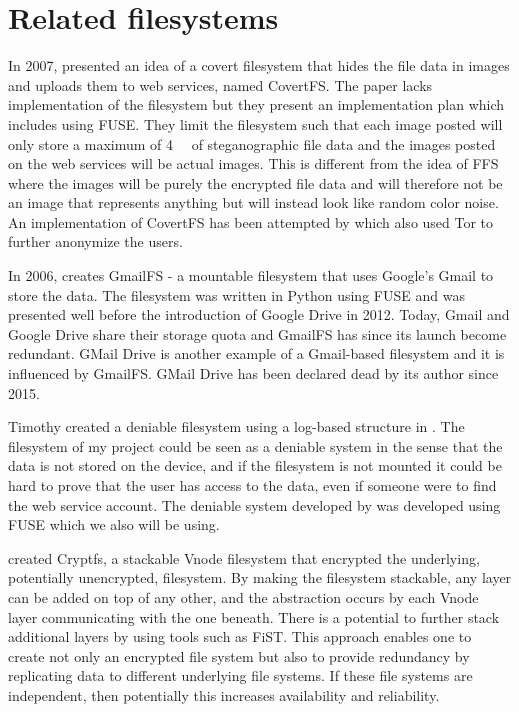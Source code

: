 \section{Related filesystems}
In 2007, \citeauthor{baliga2007web} presented an idea of a covert filesystem that hides the file data in images and uploads them to web services, named CovertFS\cite{baliga2007web}. The paper lacks implementation of the filesystem but they present an implementation plan which includes using FUSE. They limit the filesystem such that each image posted will only store a maximum of \SI{4}{\kilo\byte} of steganographic file data and the images posted on the web services will be actual images. This is different from the idea of FFS where the images will be purely the encrypted file data and will therefore not be an image that represents anything but will instead look like random color noise. An implementation of CovertFS has been attempted by \citeauthor{sosaSuperSecretFile2007} which also used Tor to further anonymize the users\cite{sosaSuperSecretFile2007}.

In 2006, \citeauthor{jonesGoogleHackUse2006} creates GmailFS - a mountable filesystem that uses Google's Gmail to store the data\cite{jonesGoogleHackUse2006, jonesGmailFilesystemImplementation2006}. The filesystem was written in Python using FUSE and was presented well before the introduction of Google Drive in 2012. Today, Gmail and Google Drive share their storage quota and GmailFS has since its launch become redundant. GMail Drive is another example of a Gmail-based filesystem and it is influenced by GmailFS\cite{viksoeViksoeDkGMail2004}. GMail Drive has been declared dead by its author since 2015.

Timothy \citeauthor{petersDEFYDeniableFile2014} created a deniable filesystem using a log-based structure in \citeyear{petersDEFYDeniableFile2014}\cite{petersDEFYDeniableFile2014}. The filesystem of my project could be seen as a deniable system in the sense that the data is not stored on the device, and if the filesystem is not mounted it could be hard to prove that the user has access to the data, even if someone were to find the web service account. The deniable system developed by \citeauthor{petersDEFYDeniableFile2014} was developed using FUSE\cite{Libfuse2021} which we also will be using.

\citeauthor{badulescuCryptfsStackableVnode1998} created Cryptfs, a stackable Vnode filesystem that encrypted the underlying, potentially unencrypted, filesystem\cite{badulescuCryptfsStackableVnode1998}. By making the filesystem stackable, any layer can be added on top of any other, and the abstraction occurs by each Vnode layer communicating with the one beneath. There is a potential to further stack additional layers by using tools such as FiST\cite{FiSTStackableFile}. This approach enables one to create not only an encrypted file system but also to provide redundancy by replicating data to different
underlying file systems. If these file systems are independent, then potentially this increases availability and reliability.